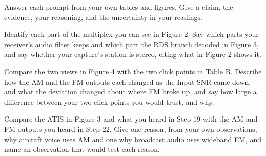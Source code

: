 \documentclass{exam}
\begin{document}
\begin{Form}
\noindent{}\hfill
{}\par
{}\par

\vspace{6pt}

Answer each prompt from your own tables and figures. Give a claim, the evidence,
your reasoning, and the uncertainty in your readings.

\begin{questions}

\question Identify each part of the multiplex you can see in Figure 2. Say which parts your
receiver's audio filter keeps and which part the RDS branch decoded in Figure 3, and say
whether your capture's station is stereo, citing what in Figure 2 shows it.
	\begin{solution}[1.3in]\end{solution}

\question Compare the two views in Figure 4 with the two click points in Table B. Describe how
the AM and the FM outputs each changed as the Input SNR came down, and what the deviation
changed about where FM broke up, and say how large a difference between your two click points
you would trust, and why.
	\begin{solution}[1.3in]\end{solution}

\newpage
\question Compare the ATIS in Figure 3 and what you heard in Step 19 with the AM and FM outputs
you heard in Step 22. Give one reason, from your own observations, why aircraft voice uses AM
and one why broadcast audio uses wideband FM, and name an observation that would test each
reason.
	\begin{solution}[3.0in]\end{solution}

\end{questions}

\docstatement

\end{Form}
\end{document}
